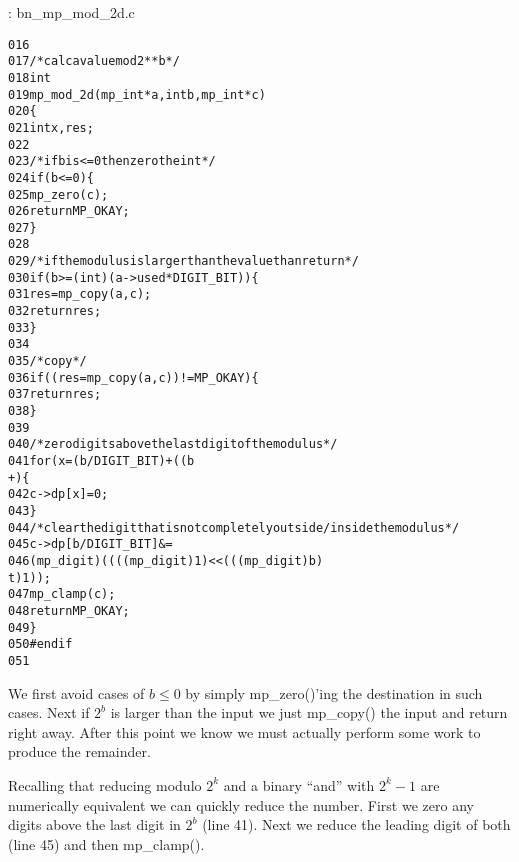 \documentclass[b5paper]{book}
\begin{document}
\vspace{+3mm}\begin{small}
\hspace{-5.1mm}{\bf File}: bn\_mp\_mod\_2d.c
\vspace{-3mm}
\begin{alltt}
016   
017   /* calc a value mod 2**b */
018   int
019   mp_mod_2d (mp_int * a, int b, mp_int * c)
020   \{
021     int     x, res;
022   
023     /* if b is <= 0 then zero the int */
024     if (b <= 0) \{
025       mp_zero (c);
026       return MP_OKAY;
027     \}
028   
029     /* if the modulus is larger than the value than return */
030     if (b >= (int) (a->used * DIGIT_BIT)) \{
031       res = mp_copy (a, c);
032       return res;
033     \}
034   
035     /* copy */
036     if ((res = mp_copy (a, c)) != MP_OKAY) \{
037       return res;
038     \}
039   
040     /* zero digits above the last digit of the modulus */
041     for (x = (b / DIGIT_BIT) + ((b % DIGIT_BIT) == 0 ? 0 : 1); x < c->used; x+
      +) \{
042       c->dp[x] = 0;
043     \}
044     /* clear the digit that is not completely outside/inside the modulus */
045     c->dp[b / DIGIT_BIT] &=
046       (mp_digit) ((((mp_digit) 1) << (((mp_digit) b) % DIGIT_BIT)) - ((mp_digi
      t) 1));
047     mp_clamp (c);
048     return MP_OKAY;
049   \}
050   #endif
051   
\end{alltt}
\end{small}

We first avoid cases of $b \le 0$ by simply mp\_zero()'ing the destination in such cases.  Next if $2^b$ is larger
than the input we just mp\_copy() the input and return right away.  After this point we know we must actually
perform some work to produce the remainder.

Recalling that reducing modulo $2^k$ and a binary ``and'' with $2^k - 1$ are numerically equivalent we can quickly reduce 
the number.  First we zero any digits above the last digit in $2^b$ (line 41).  Next we reduce the 
leading digit of both (line 45) and then mp\_clamp().
\end{document}
